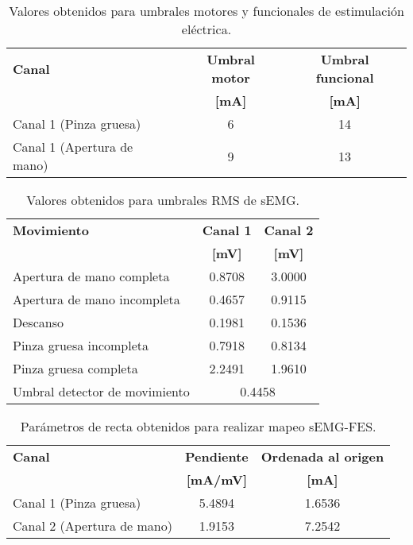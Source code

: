 \begin{table}[htbp]
	\centering
	\begin{tabular}{|l|c|c|}
	\hline
	\textbf{Canal} & \textbf{Umbral motor} & \textbf{Umbral funcional}\\
	\textbf{} & \textbf{[mA]} & \textbf{[mA]}\\ \hline	\hline
	Canal 1 (Pinza gruesa) & 6 & 14\\ \hline
	Canal 1 (Apertura de mano) & 9 & 13\\ \hline
	\end{tabular}
	\caption{Valores obtenidos para umbrales motores y funcionales de estimulación eléctrica.}
	\label{Cuadro:UmbralesFES}
\end{table}

\begin{table}[htbp]
	\centering
	\begin{tabular}{|l|c|c|}
	\hline
	\textbf{Movimiento} & \textbf{Canal 1} & \textbf{Canal 2}\\
	\textbf{} & \textbf{[mV]} & \textbf{[mV]}\\ \hline \hline
	Apertura de mano completa & 0.8708 & 3.0000\\ \hline
	Apertura de mano incompleta & 0.4657 & 0.9115\\ \hline
	Descanso & 0.1981 & 0.1536\\ \hline
	Pinza gruesa incompleta & 0.7918 & 0.8134\\ \hline
	Pinza gruesa completa & 2.2491 & 1.9610\\ \hline	
	Umbral detector de movimiento & \multicolumn{2}{|c|}{0.4458}\\ \hline
	\end{tabular}
	\caption{Valores obtenidos para umbrales RMS de sEMG.}
	\label{Cuadro:UmbralesRMS}
\end{table}

\begin{table}[htbp]
	\centering
	\begin{tabular}{|l|c|c|}
	\hline
	\textbf{Canal} & \textbf{Pendiente} & \textbf{Ordenada al origen}\\ 
	\textbf{} & \textbf{[mA/mV]} & \textbf{[mA]}\\\hline \hline
	Canal 1 (Pinza gruesa) & 5.4894 & 1.6536\\ \hline
	Canal 2 (Apertura de mano) & 1.9153 & 7.2542\\ \hline
	\end{tabular}
	\caption{Parámetros de recta obtenidos para realizar mapeo sEMG-FES.}
	\label{Cuadro:Rectas}
\end{table}


